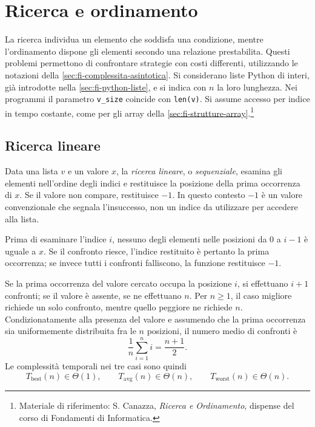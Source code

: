 \chapter{Ricerca e ordinamento}
\label{chap:ricerca-ordinamento}

La ricerca individua un elemento che soddisfa una condizione, mentre
l'ordinamento dispone gli elementi secondo una relazione prestabilita.
Questi problemi permettono di confrontare strategie con costi differenti,
utilizzando le notazioni della \cref{sec:fi-complessita-asintotica}.
Si considerano liste Python di interi, già introdotte nella
\cref{sec:fi-python-liste}, e si indica con \(n\) la loro lunghezza.
Nei programmi il parametro \texttt{v\_size} coincide con \texttt{len(v)}.
Si assume accesso per indice in tempo costante, come per gli array
della \cref{sec:fi-strutture-array}.\footnote{Materiale
di riferimento: S. Canazza, \emph{Ricerca e Ordinamento}, dispense del
corso di Fondamenti di Informatica.}

\section{Ricerca lineare}
\label{sec:fi-ricerca-lineare}

Data una lista \(v\) e un valore \(x\), la \emph{ricerca lineare}, o
\emph{sequenziale}, esamina gli elementi nell'ordine degli indici e
restituisce la posizione della prima occorrenza di \(x\). Se il valore
non compare, restituisce \(-1\). In questo contesto \(-1\) è un valore
convenzionale che segnala l'insuccesso, non un indice da utilizzare
per accedere alla lista.



Prima di esaminare l'indice \(i\), nessuno degli elementi nelle
posizioni da \(0\) a \(i-1\) è uguale a \(x\). Se il confronto riesce,
l'indice restituito è pertanto la prima occorrenza; se invece tutti
i confronti falliscono, la funzione restituisce \(-1\).

Se la prima occorrenza del valore cercato occupa la posizione \(i\),
si effettuano \(i+1\) confronti; se il valore è assente, se ne
effettuano \(n\). Per \(n\ge1\), il caso migliore richiede un solo
confronto, mentre quello peggiore ne richiede \(n\).
Condizionatamente alla presenza del valore e assumendo che la prima
occorrenza sia uniformemente distribuita fra le \(n\) posizioni,
il numero medio di confronti è
\[
  \frac{1}{n}\sum_{i=1}^{n}i=\frac{n+1}{2}.
\]
Le complessità temporali nei tre casi sono quindi
\[
  T_{\mathrm{best}}(n)\in\Theta(1),\qquad
  T_{\mathrm{avg}}(n)\in\Theta(n),\qquad
  T_{\mathrm{worst}}(n)\in\Theta(n).
\]

